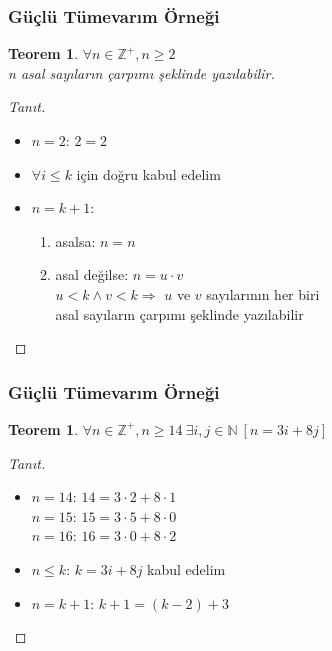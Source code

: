 \documentclass[dvipsnames]{beamer}
\theoremstyle{definition}
\theoremstyle{example}
\theoremstyle{plain}
\newtheorem{teorem}[theorem]{Teorem}
\begin{document}
\begin{frame}
  \frametitle{Güçlü Tümevarım Örneği}

  \begin{teorem}
    $\forall n \in \mathbb{Z}^+, n \geq 2$\\
      n asal sayıların çarpımı şeklinde yazılabilir.
  \end{teorem}

  \pause
  \begin{proof}[Tanıt]
    \begin{itemize}
      \item $n=2$: $2=2$

      \pause
      \item $\forall i \leq k$ için doğru kabul edelim

      \pause
      \item $n=k+1$:
      \begin{enumerate}
        \item asalsa: $n=n$

        \pause
        \item asal değilse: $n=u \cdot v$\\
          $u < k \wedge v < k \Rightarrow$ $u$ ve $v$ sayılarının her biri\\
          asal sayıların çarpımı şeklinde yazılabilir
      \end{enumerate}
    \end{itemize}
  \end{proof}
\end{frame}

\begin{frame}
  \frametitle{Güçlü Tümevarım Örneği}

  \begin{teorem}
    $\forall n \in \mathbb{Z}^+, n \geq 14~\exists i,j \in \mathbb{N}~[n=3i+8j]$
  \end{teorem}

  \pause
  \begin{proof}[Tanıt]
    \begin{itemize}
      \item $n=14$: $14=3 \cdot 2 + 8 \cdot 1$\\
        $n=15$: $15=3 \cdot 5 + 8 \cdot 0$\\
        $n=16$: $16=3 \cdot 0 + 8 \cdot 2$

      \pause
      \item $n \leq k$: $k=3i+8j$ kabul edelim

      \pause
      \item $n=k+1$: $k+1=(k-2)+3$
    \end{itemize}
  \end{proof}
\end{frame}
\end{document}
